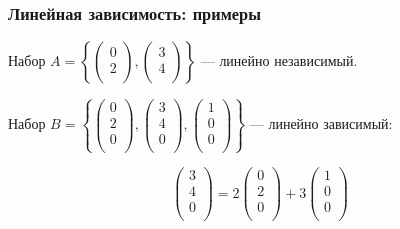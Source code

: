 \begin{frame}
\frametitle{Линейная зависимость: примеры}



Набор $A = \left\{ \begin{pmatrix}
      0 \\
      2 \\
    \end{pmatrix}, \begin{pmatrix}
      3 \\
      4 \\
    \end{pmatrix} \right\}$ — линейно независимый.

\pause

Набор $B = \left\{ \begin{pmatrix}
      0 \\
      2 \\
      0 \\
    \end{pmatrix}, \begin{pmatrix}
      3 \\
      4 \\
      0 \\
    \end{pmatrix},
    \begin{pmatrix}
      1 \\
      0 \\
      0 \\
    \end{pmatrix} \right\}$ — линейно зависимый:

    \[
      \begin{pmatrix}
        3 \\
        4 \\
        0 \\
      \end{pmatrix} = 2
    \begin{pmatrix}
      0 \\
      2 \\
      0 \\
    \end{pmatrix} + 3
    \begin{pmatrix}
      1 \\
      0 \\
      0 \\
    \end{pmatrix}  
    \]
  

\end{frame}


